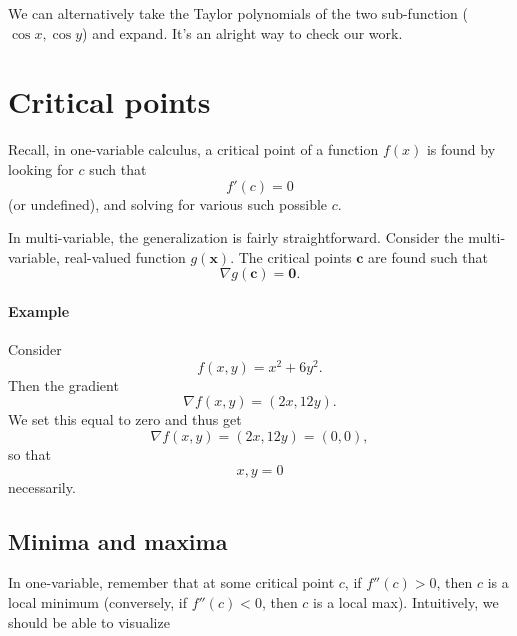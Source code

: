 \documentclass[11pt]{article}
\renewcommand{\vec}[1]{\bm{#1}}
\begin{document}
We can alternatively take the Taylor polynomials of the two sub-function (\(\cos x, \cos y\)) and expand. It's an alright way to check our work.

\section*{Critical points}

Recall, in one-variable calculus, a critical point of a function \(f(x)\) is found by looking for \(c\) such that
\[
    f'(c) = 0
\]
(or undefined), and solving for various such possible \(c\).

In multi-variable, the generalization is fairly straightforward. Consider the multi-variable, real-valued function \(g(\vec x)\). The critical points \(\vec c\) are found such that
\[
    \nabla g(\vec c) = \vec 0.
\]

\paragraph{Example}

Consider 
\[
    f(x, y) = x^2 + 6y^2.
\]
Then the gradient
\[
    \nabla f(x, y) = (2x, 12 y).
\]
We set this equal to zero and thus get
\[
    \nabla f(x, y) = (2x, 12 y) = (0, 0),
\]
so that
\[
    x, y = 0
\]
necessarily.

\subsection*{Minima and maxima}

In one-variable, remember that at some critical point \(c\), if \(f''(c) > 0\), then \(c\) is a local minimum (conversely, if \(f''(c) < 0\), then \(c\) is a local max). Intuitively, we should be able to visualize
\end{document}
